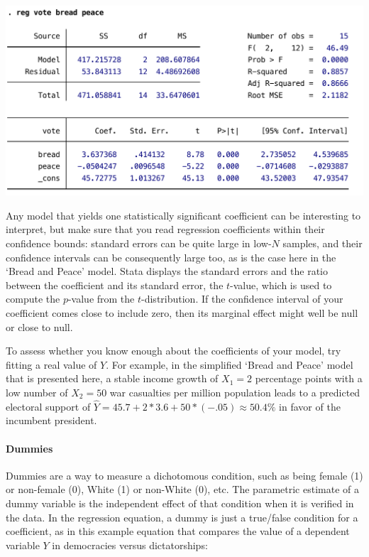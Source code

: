 	\begin{table}[htp]
		\includegraphics[scale=.5]{images/hibbs_yx1x2.pdf}

	  	\caption[Extract from  output (3): %
        Multiple regression coefficients]{\label{tbl:hibbs_yx1x2}%
		    Extract from  output (3): %
        Multiple regression coefficients. %
        \hibbs}
	\end{table}%
	
	Any model that yields one statistically significant coefficient can be interesting to interpret, but make sure that you read regression coefficients within their confidence bounds: standard errors can be quite large in low-$N$ samples, and their confidence intervals can be consequently large too, as is the case here in the `Bread and Peace' model. Stata displays the standard errors and the ratio between the coefficient and its standard error, the $t$-value, which is used to compute the $p$-value from the $t$-distribution. If the confidence interval of your coefficient comes close to include zero, then its marginal effect might well be null or close to null.
	
	To assess whether you know enough about the coefficients of your model, try fitting a real value of $Y$. For example, in the simplified `Bread and Peace' model that is presented here, a stable income growth of $X_1=2$ percentage points with a low number of $X_2=50$ war casualties per million population leads to a predicted electoral support of $\hat Y = 45.7 + 2*3.6 + 50*(-.05) \approx 50.4\%$ in favor of the incumbent president.

	\paragraph{Dummies}%
	\label{sec:dummies}%
	Dummies are a way to measure a dichotomous condition, such as being female (1) or non-female (0), White (1) or non-White (0), etc. The parametric estimate of a dummy variable is the independent effect of that condition when it is verified in the data. In the regression equation, a dummy is just a true/false condition for a coefficient, as in this example equation that compares the value of a dependent variable $Y$ in democracies versus dictatorships:

